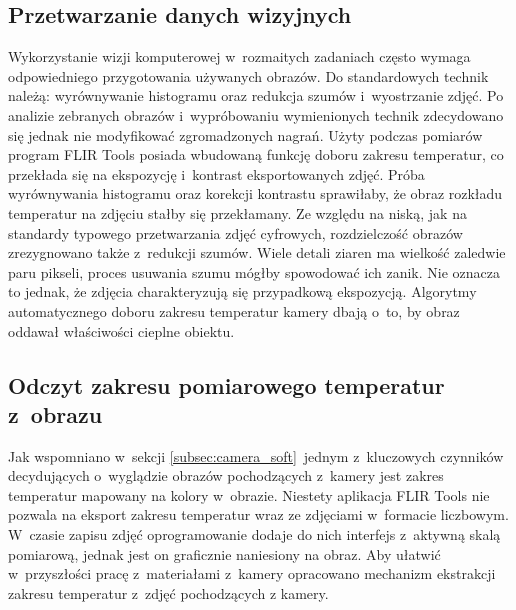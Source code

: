 \subsection{Przetwarzanie danych wizyjnych}
Wykorzystanie wizji komputerowej w~rozmaitych zadaniach często wymaga
odpowiedniego przygotowania używanych obrazów.
Do standardowych technik należą: wyrównywanie histogramu oraz redukcja szumów
i~wyostrzanie zdjęć.
Po analizie zebranych obrazów i~wypróbowaniu wymienionych technik zdecydowano
się jednak nie modyfikować zgromadzonych nagrań.
Użyty podczas pomiarów program FLIR Tools posiada wbudowaną funkcję doboru
zakresu temperatur, co przekłada się na ekspozycję i~kontrast eksportowanych
zdjęć.
Próba wyrównywania histogramu oraz korekcji kontrastu sprawiłaby, że obraz
rozkładu temperatur na zdjęciu stałby się przekłamany.
Ze względu na niską, jak na standardy typowego przetwarzania zdjęć cyfrowych,
rozdzielczość obrazów zrezygnowano także z~redukcji szumów.
Wiele detali ziaren ma wielkość zaledwie paru pikseli, proces usuwania szumu
mógłby spowodować ich zanik.
Nie oznacza to jednak, że zdjęcia charakteryzują się przypadkową ekspozycją.
Algorytmy automatycznego doboru zakresu temperatur kamery dbają o~to, by obraz
oddawał właściwości cieplne obiektu.

\subsection{Odczyt zakresu pomiarowego temperatur z~obrazu}
Jak wspomniano w~sekcji \ref{subsec:camera_soft}~jednym z~kluczowych czynników
decydujących o~wyglądzie obrazów pochodzących z~kamery jest zakres temperatur
mapowany na kolory w~obrazie.
Niestety aplikacja FLIR Tools nie pozwala na eksport zakresu temperatur wraz ze
zdjęciami w~formacie liczbowym.
W~czasie zapisu zdjęć oprogramowanie dodaje do nich interfejs z~aktywną skalą
pomiarową, jednak jest on graficznie naniesiony na obraz.
Aby ułatwić w~przyszłości pracę z~materiałami z~kamery opracowano mechanizm
ekstrakcji zakresu temperatur z~zdjęć pochodzących z kamery.

